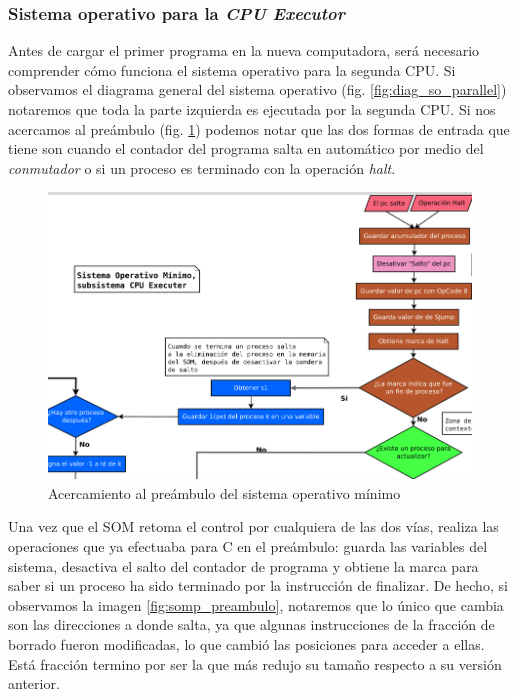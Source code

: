 \documentclass[letterpaper,12pt,oneside]{book}
\begin{document}
			
			
			\subsubsection{Sistema operativo para la \textit{CPU Executor}}
			
				Antes de cargar el primer programa en la nueva computadora, será necesario comprender cómo funciona el sistema operativo para la
				segunda CPU. Si observamos el diagrama general 
				del sistema operativo (fig. \ref{fig:diag_so_parallel}) notaremos que toda la parte izquierda
				es ejecutada por la segunda CPU. Si nos acercamos al preámbulo (fig. \ref{fig:diag_so_paralel_cpue}) podemos notar que las
				dos formas de entrada que tiene son cuando el contador del programa salta en automático por medio del \textit{conmutador} o si
				un proceso es terminado con la operación \textit{halt}. 

			
			
			\begin{figure}[h]		
				\centering
				\includegraphics[scale=0.5]{media/Paralela/diag_so_paralel_cpue.png}
				\caption{ Acercamiento al preámbulo del sistema operativo mínimo}
				\label{fig:diag_so_paralel_cpue}
			\end{figure}	
			

				Una vez que el SOM retoma el control por cualquiera de las dos vías, realiza las operaciones que ya efectuaba para C en el preámbulo: 
				guarda las variables del sistema, desactiva
				el salto del contador de programa y obtiene la marca para saber si un proceso ha sido terminado por la instrucción de finalizar.
				 De hecho,
				si observamos la imagen \ref{fig:somp_preambulo}, notaremos que lo único que cambia son las direcciones a donde salta,
				ya que algunas instrucciones de la fracción de borrado fueron modificadas, lo que cambió las posiciones para acceder a ellas. 
				Está fracción
				termino por ser la que más redujo su tamaño
				respecto a su versión anterior.
			
\end{document}
